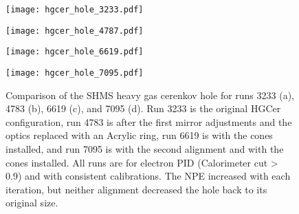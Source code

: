 \begin{figure}
  \centering
  \begin{minipage}[b]{0.48\linewidth}
    \texttt{[image: hgcer\_hole\_3233.pdf]}
  \end{minipage}
  \hfill
  \begin{minipage}[b]{0.48\linewidth}
    \texttt{[image: hgcer\_hole\_4787.pdf]}
  \end{minipage}
  
  \vspace{0.5cm}
  
  \begin{minipage}[b]{0.48\linewidth}
    \texttt{[image: hgcer\_hole\_6619.pdf]}
  \end{minipage}
  \hfill
  \begin{minipage}[b]{0.48\linewidth}
    \texttt{[image: hgcer\_hole\_7095.pdf]}
  \end{minipage}
  
  \caption{Comparison of the SHMS heavy gas cerenkov hole for runs 3233 (a), 4783 (b), 6619 (c), and 7095 (d). Run 3233 is the original HGCer configuration, run 4783 is after the first mirror adjustments and the optics replaced with an Acrylic ring, run 6619 is with the cones installed, and run 7095 is with the second alignment and with the cones installed. All runs are for electron PID (Calorimeter cut > 0.9) and with consistent calibrations. The NPE increased with each iteration, but neither alignment decreased the hole back to its original size.}
  \label{fig:3-3_hgcer_hole}
\end{figure}

